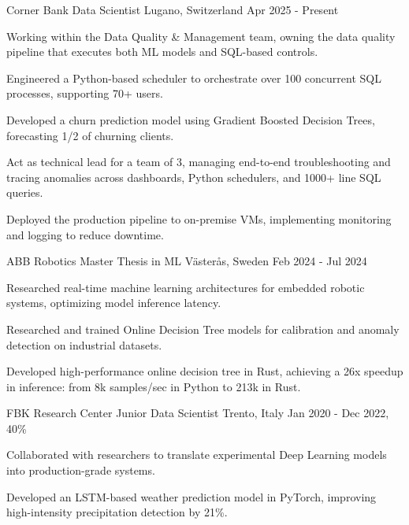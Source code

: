 

\begin{cventries}
\cventry
  {Corner Bank}
  {Data Scientist}
  {Lugano, Switzerland}
  {Apr 2025 - Present}
  {
    \begin{cvitems}
      \item {Working within the Data Quality \& Management team, owning the data quality pipeline that executes both ML models and SQL-based controls.}
      \item {Engineered a Python-based scheduler to orchestrate over 100 concurrent SQL processes, supporting 70+ users.}
      \item {Developed a churn prediction model using Gradient Boosted Decision Trees, forecasting 1/2 of churning clients.}
      \item {Act as technical lead for a team of 3, managing end-to-end troubleshooting and tracing anomalies across dashboards, Python schedulers, and 1000+ line SQL queries.}
      \item {Deployed the production pipeline to on-premise VMs, implementing monitoring and logging to reduce downtime.}
    \end{cvitems}
  }
\cventry
  {ABB Robotics}
  {Master Thesis in ML}
  {Västerås, Sweden}
  {Feb 2024 - Jul 2024}
  {
    \begin{cvitems}
      \item {Researched real-time machine learning architectures for embedded robotic systems, optimizing model inference latency.}
      \item {Researched and trained Online Decision Tree models for calibration and anomaly detection on industrial datasets.}
      \item {Developed high-performance online decision tree in Rust, achieving a 26x speedup in inference: from 8k samples/sec in Python to 213k in Rust.}
    \end{cvitems}
  }
\cventry
  {FBK Research Center}
  {Junior Data Scientist}
  {Trento, Italy}
  {Jan 2020 - Dec 2022, 40\%}
  {
    \begin{cvitems}
      \item {Collaborated with researchers to translate experimental Deep Learning models into production-grade systems.}
      \item {Developed an LSTM-based weather prediction model in PyTorch, improving high-intensity precipitation detection by 21\%.}

\end{cvitems}}
\end{cventries}
